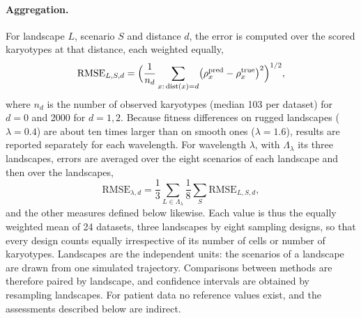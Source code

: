 \documentclass[11pt]{article}
\begin{document}
\paragraph{Aggregation.}
For landscape $L$, scenario $S$ and distance $d$, the error is computed over
the scored karyotypes at that distance, each weighted equally,
\begin{equation}
  \mathrm{RMSE}_{L,S,d}=\Bigl(\frac{1}{n_d}\sum_{x:\,\mathrm{dist}(x)=d}
  \bigl(\rho^{\mathrm{pred}}_x-\rho^{\mathrm{true}}_x\bigr)^2\Bigr)^{1/2},
  \label{eq:rmse}
\end{equation}
where $n_d$ is the number of observed karyotypes (median 103 per dataset) for
$d=0$ and 2000 for $d=1,2$. Because fitness differences on rugged landscapes
($\lambda=0.4$) are about ten times larger than on smooth ones
($\lambda=1.6$), results are reported separately for each wavelength. For
wavelength $\lambda$, with $\Lambda_\lambda$ its three landscapes, errors are
averaged over the eight scenarios of each landscape and then over the
landscapes,
\begin{equation}
  \mathrm{RMSE}_{\lambda,d}=\frac{1}{3}\sum_{L\in\Lambda_\lambda}\frac{1}{8}\sum_S\mathrm{RMSE}_{L,S,d},
  \label{eq:rmse-pooled}
\end{equation}
and the other measures defined below likewise. Each value is thus the
equally weighted mean of 24 datasets, three landscapes by eight sampling
designs, so that every design counts equally irrespective of its number of cells
or number of karyotypes. Landscapes are the independent units: the scenarios of a landscape are drawn from one simulated trajectory.
Comparisons between methods are therefore paired by landscape, and confidence
intervals are obtained by resampling landscapes. For patient data no
reference values exist, and the assessments described below are indirect.
\end{document}
